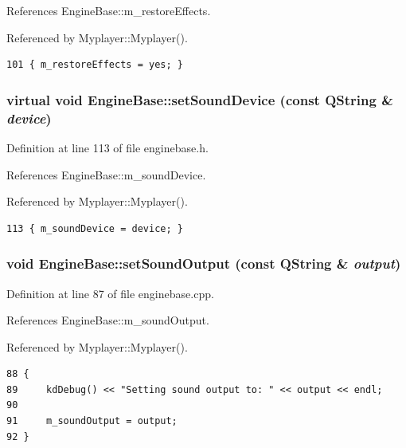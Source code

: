 References Engine\-Base::m\_\-restore\-Effects.

Referenced by Myplayer::Myplayer().



\footnotesize\begin{verbatim}101 { m_restoreEffects = yes; }
\end{verbatim}\normalsize 
{}
\subsubsection{\setlength{\rightskip}{0pt plus 5cm}virtual void Engine\-Base::set\-Sound\-Device (const QString \& {\em device})\hspace{0.3cm}{\tt  [inline, virtual, inherited]}}\label{classEngineBase_EngineBasea26}




Definition at line 113 of file enginebase.h.

References Engine\-Base::m\_\-sound\-Device.

Referenced by Myplayer::Myplayer().



\footnotesize\begin{verbatim}113 { m_soundDevice = device; }
\end{verbatim}\normalsize 
{}
\subsubsection{\setlength{\rightskip}{0pt plus 5cm}void Engine\-Base::set\-Sound\-Output (const QString \& {\em output})\hspace{0.3cm}{\tt  [virtual, inherited]}}\label{classEngineBase_EngineBasea25}




Definition at line 87 of file enginebase.cpp.

References Engine\-Base::m\_\-sound\-Output.

Referenced by Myplayer::Myplayer().



\footnotesize\begin{verbatim}88 {
89     kdDebug() << "Setting sound output to: " << output << endl;
90     
91     m_soundOutput = output;
92 }
\end{verbatim}\normalsize 
{}
